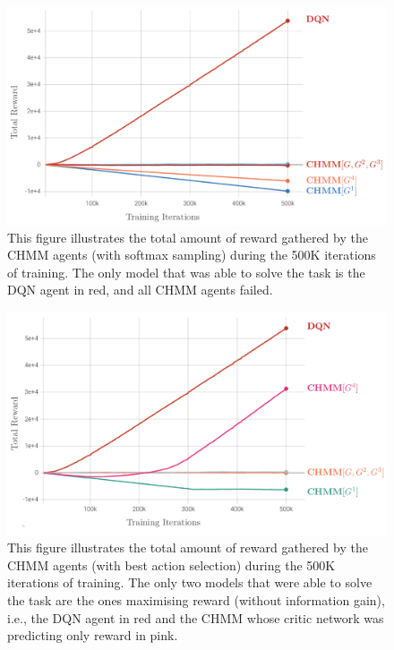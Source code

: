 \documentclass[twoside,11pt]{article}
\begin{document}
\begin{figure}[H]
	\begin{center}
		\includegraphics[scale=0.3]{chmm_rewards_s.png}
	\end{center}
   \caption{This figure illustrates the total amount of reward gathered by the CHMM agents (with softmax sampling) during the 500K iterations of training. The only model that was able to solve the task is the DQN agent in red, and all CHMM agents failed.}
   \label{fig:CHMM_rewards_s}
\end{figure}

\begin{figure}[H]
	\begin{center}
	    \includegraphics[scale=0.3]{chmm_rewards_b.png}
	\end{center}
   \caption{This figure illustrates the total amount of reward gathered by the CHMM agents (with best action selection) during the 500K iterations of training. The only two models that were able to solve the task are the ones maximising reward (without information gain), i.e., the DQN agent in red and the CHMM whose critic network was predicting only reward in pink.}
   \label{fig:CHMM_rewards_b}
\end{figure}
\end{document}

